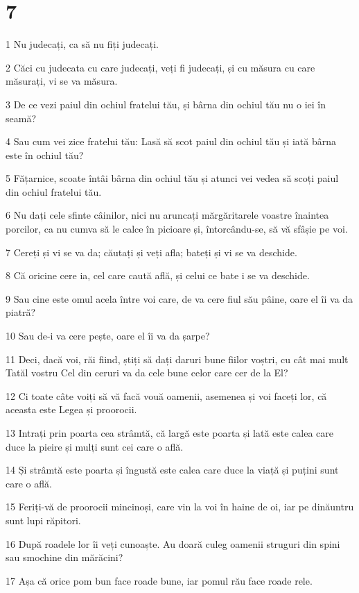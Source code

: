 \chapter{7}

\par 1 Nu judecați, ca să nu fiți judecați.
\par 2 Căci cu judecata cu care judecați, veți fi judecați, și cu măsura cu care măsurați, vi se va măsura.
\par 3 De ce vezi paiul din ochiul fratelui tău, și bârna din ochiul tău nu o iei în seamă?
\par 4 Sau cum vei zice fratelui tău: Lasă să scot paiul din ochiul tău și iată bârna este în ochiul tău?
\par 5 Fățarnice, scoate întâi bârna din ochiul tău și atunci vei vedea să scoți paiul din ochiul fratelui tău.
\par 6 Nu dați cele sfinte câinilor, nici nu aruncați mărgăritarele voastre înaintea porcilor, ca nu cumva să le calce în picioare și, întorcându-se, să vă sfâșie pe voi.
\par 7 Cereți și vi se va da; căutați și veți afla; bateți și vi se va deschide.
\par 8 Că oricine cere ia, cel care caută află, și celui ce bate i se va deschide.
\par 9 Sau cine este omul acela între voi care, de va cere fiul său pâine, oare el îi va da piatră?
\par 10 Sau de-i va cere pește, oare el îi va da șarpe?
\par 11 Deci, dacă voi, răi fiind, știți să dați daruri bune fiilor voștri, cu cât mai mult Tatăl vostru Cel din ceruri va da cele bune celor care cer de la El?
\par 12 Ci toate câte voiți să vă facă vouă oamenii, asemenea și voi faceți lor, că aceasta este Legea și proorocii.
\par 13 Intrați prin poarta cea strâmtă, că largă este poarta și lată este calea care duce la pieire și mulți sunt cei care o află.
\par 14 Și strâmtă este poarta și îngustă este calea care duce la viață și puțini sunt care o află.
\par 15 Feriți-vă de proorocii mincinoși, care vin la voi în haine de oi, iar pe dinăuntru sunt lupi răpitori.
\par 16 După roadele lor îi veți cunoaște. Au doară culeg oamenii struguri din spini sau smochine din mărăcini?
\par 17 Așa că orice pom bun face roade bune, iar pomul rău face roade rele.
